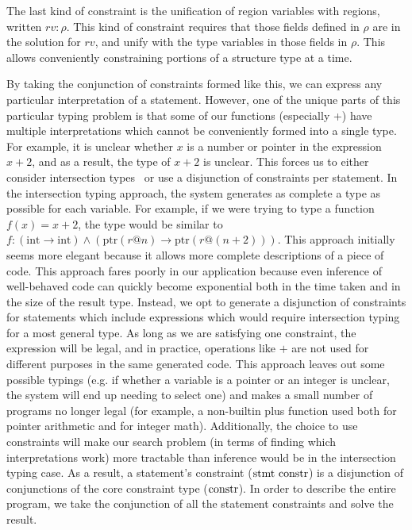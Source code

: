 The last kind of constraint is the unification of region variables with regions, written $rv : \rho$. This kind of constraint requires that those fields defined in $\rho$ are in the solution for $rv$, and unify with the type variables in those fields in $\rho$. This allows conveniently constraining portions of a structure type at a time.

By taking the conjunction of constraints formed like this, we can express any particular interpretation of a statement.
However, one of the unique parts of this particular typing problem is that some of our functions (especially +) have multiple interpretations which cannot be conveniently formed into a single type. For example, it is unclear whether $x$ is a number or pointer in the expression $x + 2$, and as a result, the type of $x + 2$ is unclear.
This forces us to either consider intersection types~\cite{Jim1995,Shao1993} or use a disjunction of constraints per statement. In the intersection typing approach, the system generates as complete a type as possible for each variable. For example, if we were trying to type a function $f(x) = x + 2$, the type would be similar to $f : (\mathrm{int} \rightarrow \mathrm{int}) \wedge (\mathrm{ptr}(r@n) \rightarrow \mathrm{ptr}(r@(n+2)))$.
This approach initially seems more elegant because it allows more complete descriptions of a piece of code.
This approach fares poorly in our application because even inference of well-behaved code can quickly become exponential both in the time taken and in the size of the result type.
Instead, we opt to generate a disjunction of constraints for statements which include expressions which would require intersection typing for a most general type. As long as we are satisfying one constraint, the expression will be legal, and in practice, operations like $+$ are not used for different purposes in the same generated code. This approach leaves out some possible typings (e.g. if whether a variable is a pointer or an integer is unclear, the system will end up needing to select one) and makes a small number of programs no longer legal (for example, a non-builtin plus function used both for pointer arithmetic and for integer math). Additionally, the choice to use constraints will make our search problem (in terms of finding which interpretations work) more tractable than inference would be in the intersection typing case. As a result, a statement's constraint ($\textrm{stmt constr}$) is a disjunction of conjunctions of the core constraint type ($\textrm{constr}$). In order to describe the entire program, we take the conjunction of all the statement constraints and solve the result.

